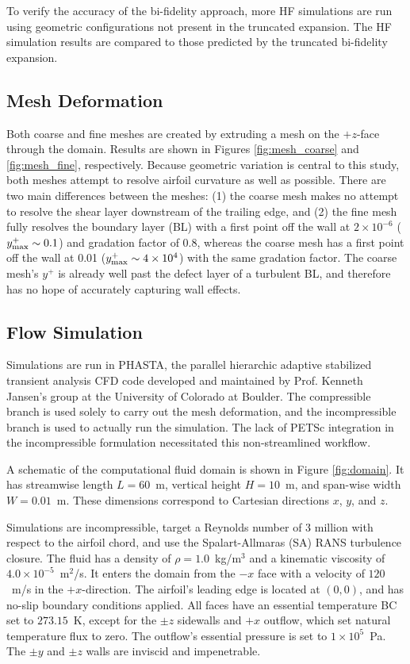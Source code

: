 \documentclass[11pt]{article}
\begin{document}
To verify the accuracy of the bi-fidelity approach, more HF simulations are run using geometric configurations not present in the truncated expansion. The HF simulation results are compared to those predicted by the truncated bi-fidelity expansion.

\subsection{Mesh Deformation}

Both coarse and fine meshes are created by extruding a mesh on the $+z$-face through the domain. Results are shown in Figures \ref{fig:mesh_coarse} and \ref{fig:mesh_fine}, respectively. Because geometric variation is central to this study, both meshes attempt to resolve airfoil curvature as well as possible. There are two main differences between the meshes: (1) the coarse mesh makes no attempt to resolve the shear layer downstream of the trailing edge, and (2) the fine mesh fully resolves the boundary layer (BL) with a first point off the wall at $2\times 10^{-6}$ ($y^+_{\text{max}} \sim 0.1$) and gradation factor of 0.8, whereas the coarse mesh has a first point off the wall at 0.01 ($y^+_{\text{max}} \sim 4 \times 10^4$) with the same gradation factor. The coarse mesh's $y^+$ is already well past the defect layer of a turbulent BL, and therefore has no hope of accurately capturing wall effects.

\subsection{Flow Simulation}

Simulations are run in PHASTA, the parallel hierarchic adaptive stabilized transient analysis CFD code developed and maintained by Prof. Kenneth Jansen's group at the University of Colorado at Boulder. The compressible branch is used solely to carry out the mesh deformation, and the incompressible branch is used to actually run the simulation. The lack of PETSc integration in the incompressible formulation necessitated this non-streamlined workflow.

A schematic of the computational fluid domain is shown in Figure \ref{fig:domain}. It has streamwise length $L = 60$~m, vertical height $H = 10$~m, and span-wise width $W = 0.01$~m. These dimensions correspond to Cartesian directions $x$, $y$, and $z$.

Simulations are incompressible, target a Reynolds number of 3 million with respect to the airfoil chord, and use the Spalart-Allmaras (SA) RANS turbulence closure. The fluid has a density of $\rho = 1.0$~kg/m$^3$ and a kinematic viscosity of $4.0 \times 10^{-5}$~m$^2$/s. It enters the domain from the $-x$ face with a velocity of $120$~m/s in the $+x$-direction. The airfoil's leading edge is located at $(0,0)$, and has no-slip boundary conditions applied. All faces have an essential temperature BC set to $273.15$~K, except for the $\pm z$ sidewalls and $+x$ outflow, which set natural temperature flux to zero. The outflow's essential pressure is set to $1\times 10^{5}$~Pa. The $\pm y$ and $\pm z$ walls are inviscid and impenetrable.
\end{document}
